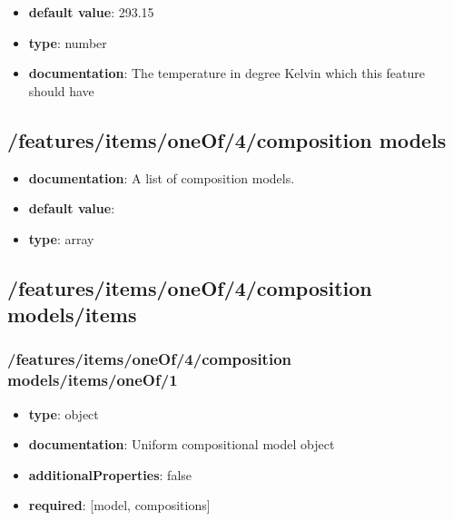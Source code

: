 \begin{itemize}\item {\bf default value}: 293.15
\item {\bf type}: number
\item {\bf documentation}: The temperature in degree Kelvin which this feature should have
\end{itemize}\subsection{/features/items/oneOf/4/composition models}
\begin{itemize}\item {\bf documentation}: A list of composition models.
\item {\bf default value}: 
\item {\bf type}: array
\end{itemize}\subsection{/features/items/oneOf/4/composition models/items}

\subsubsection{/features/items/oneOf/4/composition models/items/oneOf/1}
\begin{itemize}\item {\bf type}: object
\item {\bf documentation}: Uniform compositional model object
\item {\bf additionalProperties}: false
\item {\bf required}: [model, compositions]\end{itemize}
